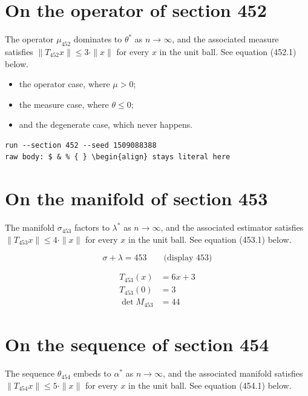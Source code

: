 \documentclass{article}
\begin{document}
\section{On the operator of section 452}
The operator $\mu_{452}$ dominates to $\theta^{*}$ as $n \to \infty$,
and the associated measure satisfies $\|T_{452} x\| \leq 3 \cdot \|x\|$
for every $x$ in the unit ball. See equation (452.1) below.

\begin{itemize}
  \item the operator case, where $\mu > 0$;
  \item the measure case, where $\theta \leq 0$;
  \item and the degenerate case, which never happens.
\end{itemize}

\begin{verbatim}
run --section 452 --seed 1509088388
raw body: $ & % { } \begin{align} stays literal here
\end{verbatim}

\section{On the manifold of section 453}
The manifold $\sigma_{453}$ factors to $\lambda^{*}$ as $n \to \infty$,
and the associated estimator satisfies $\|T_{453} x\| \leq 4 \cdot \|x\|$
for every $x$ in the unit ball. See equation (453.1) below.

$$
\sigma + \lambda = 453 \qquad \text{(display 453)}
$$

\begin{align}
T_{453}(x) &= 6 x + 3 \\
T_{453}(0) &= 3 \\
\det M_{453} &= 44
\end{align}

\section{On the sequence of section 454}
The sequence $\theta_{454}$ embeds to $\alpha^{*}$ as $n \to \infty$,
and the associated manifold satisfies $\|T_{454} x\| \leq 5 \cdot \|x\|$
for every $x$ in the unit ball. See equation (454.1) below.
\end{document}
